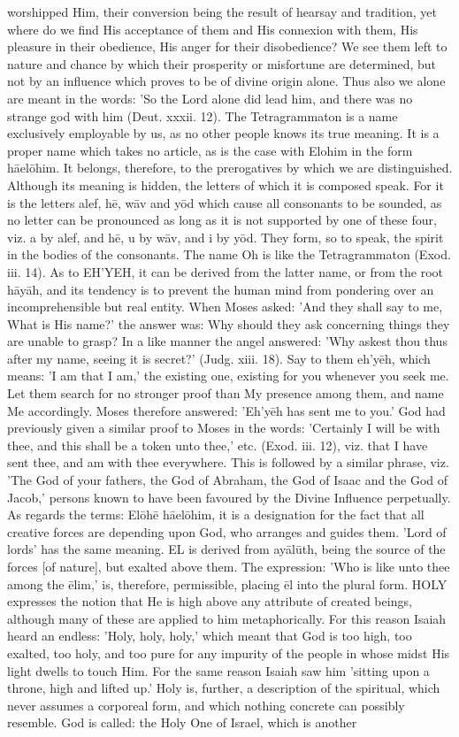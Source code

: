 \documentclass[12pt]{article}
\begin{document}
worshipped Him, their conversion being the result of hearsay and tradition, yet where do we find His acceptance of them and His connexion with them, His pleasure in their obedience, His anger for their disobedience? We see them left to nature and chance by which their prosperity or misfortune are determined, but not by an influence which proves to be of divine origin alone. Thus also we alone are meant in the words: 'So the Lord alone did lead him, and there was no strange god with him (Deut. xxxii. 12). The Tetragrammaton is a name exclusively employable by us, as no other people knows its true meaning. It is a proper name which takes no article, as is the case with Elohim in the form hāelōhim. It belongs, therefore, to the prerogatives by which we are distinguished. Although its meaning is hidden, the letters of which it is composed speak. For it is the letters alef, hē, wāv and yōd which cause all consonants to be sounded, as no letter can be pronounced as long as it is not supported by one of these four, viz. a by alef, and hē, u by wāv, and i by yōd. They form, so to speak, the spirit in the bodies of the consonants. The name Oh is like the Tetragrammaton (Exod. iii. 14). As to EH’YEH, it can be derived from the latter name, or from the root hāyāh, and its tendency is to prevent the human mind from pondering over an incomprehensible but real entity. When Moses asked: 'And they shall say to me, What is His name?' the answer was: Why should they ask concerning things they are unable to grasp? In a like manner the angel answered: 'Why askest thou thus after my name, seeing it is secret?' (Judg. xiii. 18). Say to them eh’yēh, which means: 'I am that I am,' the existing one, existing for you whenever you seek me. Let them search for no stronger proof than My presence among them, and name Me accordingly. Moses therefore answered: 'Eh’yēh has sent me to you.' God had previously given a similar proof to Moses in the words: 'Certainly I will be with thee, and this shall be a token unto thee,' etc. (Exod. iii. 12), viz. that I have sent thee, and am with thee everywhere. This is followed by a similar phrase, viz. 'The God of your fathers, the God of Abraham, the God of Isaac and the God of Jacob,' persons known to have been favoured by the Divine Influence perpetually. As regards the terms: Elōhē hāelōhim, it is a designation for the fact that all creative forces are depending upon God, who arranges and guides them. 'Lord of lords' has the same meaning. EL is derived from ayālūth, being the source of the forces [of nature], but exalted above them. The expression: 'Who is like unto thee among the ēlim,' is, therefore, permissible, placing ēl into the plural form. HOLY expresses the notion that He is high above any attribute of created beings, although many of these are applied to him metaphorically. For this reason Isaiah heard an endless: 'Holy, holy, holy,' which meant that God is too high, too exalted, too holy, and too pure for any impurity of the people in whose midst His light dwells to touch Him. For the same reason Isaiah saw him 'sitting upon a throne, high and lifted up.' Holy is, further, a description of the spiritual, which never assumes a corporeal form, and which nothing concrete can possibly resemble. God is called: the Holy One of Israel, which is another 
\end{document}

